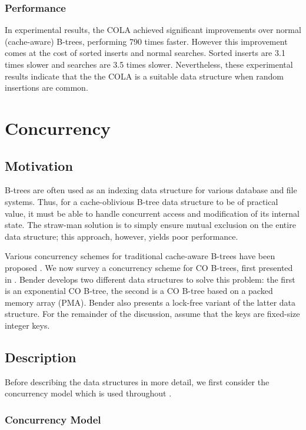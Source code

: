 \documentclass{style}
\begin{document}
\subsubsection{Performance}

In experimental results, the COLA achieved significant improvements over
normal (cache-aware) B-trees, performing 790 times faster. However this
improvement comes at the cost of sorted inserts and normal searches. Sorted
inserts are 3.1 times slower and searches are 3.5 times slower. Nevertheless,
these experimental results indicate that the the COLA is a suitable data
structure when random insertions are common.

\section{Concurrency}

\subsection{Motivation}

B-trees are often used as an indexing data structure for various database and
file systems. Thus, for a cache-oblivious B-tree data structure to be of
practical value, it must be able to handle concurrent access and modification
of its internal state. The straw-man solution is to simply ensure mutual
exclusion on the entire data structure; this approach, however, yields poor
performance.

Various concurrency schemes for traditional cache-aware B-trees have been
proposed \cite{BayerS77, LehmanY81}. We now survey a concurrency scheme for CO
B-trees, first presented in \cite{BenderFiGi05}. Bender develops two different
data structures to solve this problem: the first is an exponential CO B-tree,
the second is a CO B-tree based on a packed memory array (PMA). Bender also
presents a lock-free variant of the latter data structure. For the remainder
of the discussion, assume that the keys are fixed-size integer keys.

\subsection{Description}

Before describing the data structures in more detail, we first consider
the concurrency model which is used throughout \cite{BenderFiGi05}.

\subsubsection{Concurrency Model}
\end{document}
